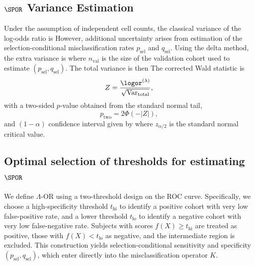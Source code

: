 \documentclass[lineno]{biometrika}
\begin{document}
\subsection{$\SPOR$ Variance Estimation}
Under the assumption of independent cell counts, the classical variance of the log-odds ratio is
%
However, additional uncertainty arises from estimation of the selection-conditional misclassification rates $p_{\text{sel}}$ and $q_{\text{sel}}$. Using the delta method, the extra variance is
%
where $n_{\text{val}}$ is the size of the validation cohort used to estimate $(p_{\text{sel}},q_{\text{sel}})$. The total variance is then
%
The corrected Wald statistic is
\[
Z = \frac{\logor^{(\lambda)}}{\sqrt{\mathrm{Var}_{\text{total}}}},
\]
with a two-sided $p$-value obtained from the standard normal tail,
\[
p_{\text{two}} = 2 \Phi(-|Z|),
\]
and $(1-\alpha)$ confidence interval given by
where $z_{\alpha/2}$ is the standard normal critical value.


\subsection{Optimal selection of thresholds for estimating $\SPOR$}
We define $\Lambda$-OR using a two-threshold design on the ROC curve. 
Specifically, we choose a high-specificity threshold $t_{\mathrm{hi}}$ to identify 
a positive cohort with very low false-positive rate, and a lower threshold 
$t_{\mathrm{lo}}$ to identify a negative cohort with very low false-negative rate. 
Subjects with scores $f(X) \ge t_{\mathrm{hi}}$ are treated as positive, 
those with $f(X) < t_{\mathrm{lo}}$ as negative, and the intermediate region is excluded. 
This construction yields selection-conditional sensitivity and specificity 
$(p_{\text{sel}}, q_{\text{sel}})$, which enter directly into the 
misclassification operator $K$.
\end{document}
